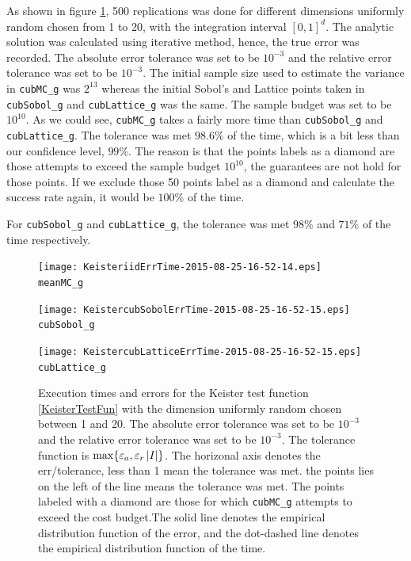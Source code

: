 \documentclass{iitthesis}
\begin{document}
As shown in figure \ref{fig:KeisterTestFun}, 500 replications was done for different dimensions uniformly random chosen from 1 to 20, with the integration interval $[0,1]^d$. The analytic solution was calculated using iterative method, hence, the true error was recorded. The absolute error tolerance was set to be $10^{-3}$ and the relative error tolerance was set to be $10^{-3}$. The initial sample size used to estimate the variance in {\tt cubMC\_g} was $2^{13}$ whereas the initial Sobol's and Lattice points taken in {\tt cubSobol\_g} and {\tt cubLattice\_g} was the same. The sample budget was set to be $10^{10}$. As we could see,  {\tt cubMC\_g} takes a fairly more time than {\tt cubSobol\_g} and {\tt cubLattice\_g}. The tolerance was met $98.6\%$ of the time, which is a bit less than our confidence level, $99\%$. The reason is that the points labels as a diamond are those attempts to exceed the sample budget $10^{10}$,  the guarantees are not hold for those points. If we exclude those 50 points label as a diamond and calculate the success rate again, it would be $100\%$ of the time.

For {\tt cubSobol\_g} and {\tt cubLattice\_g}, the tolerance was met $98\%$ and $71\%$ of the time respectively. 

\begin{figure}
\centering
\begin{minipage}{9cm} \centering \texttt{[image: KeisteriidErrTime-2015-08-25-16-52-14.eps]} \\ {\tt meanMC\_g}  \end{minipage}
\begin{minipage}{7cm} \centering \texttt{[image: KeistercubSobolErrTime-2015-08-25-16-52-15.eps]} \\  {\tt cubSobol\_g}\end{minipage}
\begin{minipage}{7cm} \centering \texttt{[image: KeistercubLatticeErrTime-2015-08-25-16-52-15.eps]} \\ {\tt cubLattice\_g} \end{minipage}
\caption{Execution times and errors for the Keister test function \eqref{KeisterTestFun} with the dimension uniformly random chosen between 1 and 20. The absolute error tolerance was set to be $10^{-3}$ and the relative error tolerance was set to be $10^{-3}$.  The tolerance function is $\max\{\varepsilon_a,\varepsilon_r \left \lvert I \right \rvert\}$. The horizonal axis denotes the err/tolerance, less than 1 mean the tolerance was met. the points lies on the left of the line means the tolerance was met. The points labeled with a diamond are those for which  {\tt cubMC\_g}  attempts to exceed the cost budget.The solid line denotes the empirical distribution function of the error, and the dot-dashed line denotes the empirical distribution function of the time.\label{fig:KeisterTestFun} }
\end{figure}
\end{document}
